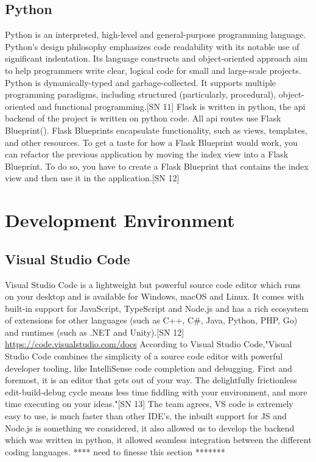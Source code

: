 \subsection{Python}
Python is an interpreted, high-level and general-purpose programming language. Python's design philosophy emphasizes code readability with its notable use of significant indentation. Its language constructs and object-oriented approach aim to help programmers write clear, logical code for small and large-scale projects.
Python is dynamically-typed and garbage-collected. It supports multiple programming paradigms, including structured (particularly, procedural), object-oriented and functional programming.[SN 11] 
Flask is written in python, the api backend of the project is written on python code. All api routes use Flask Blueprint().
Flask Blueprints encapsulate functionality, such as views, templates, and other resources. To get a taste for how a Flask Blueprint would work, you can refactor the previous application by moving the index view into a Flask Blueprint. To do so, you have to create a Flask Blueprint that contains the index view and then use it in the application.[SN 12] 

\section{Development Environment}
\subsection{Visual Studio Code}
Visual Studio Code is a lightweight but powerful source code editor which runs on your desktop and is available for Windows, macOS and Linux. It comes with built-in support for JavaScript, TypeScript and Node.js and has a rich ecosystem of extensions for other languages (such as C++, C\#, Java, Python, PHP, Go) and runtimes (such as .NET and Unity).[SN 12] \url{https://code.visualstudio.com/docs}
According to Visual Studio Code,"Visual Studio Code combines the simplicity of a source code editor with powerful developer tooling, like IntelliSense code completion and debugging.
First and foremost, it is an editor that gets out of your way. The delightfully frictionless edit-build-debug cycle means less time fiddling with your environment, and more time executing on your ideas."[SN 13] 
The team agrees, VS code is extremely easy to use, is much faster than other IDE's, the inbuilt support for JS and Node.js is something we considered, it also allowed us to develop the backend which was written in python, it allowed seamless integration between the different coding languages. **** need to finesse this section *******


